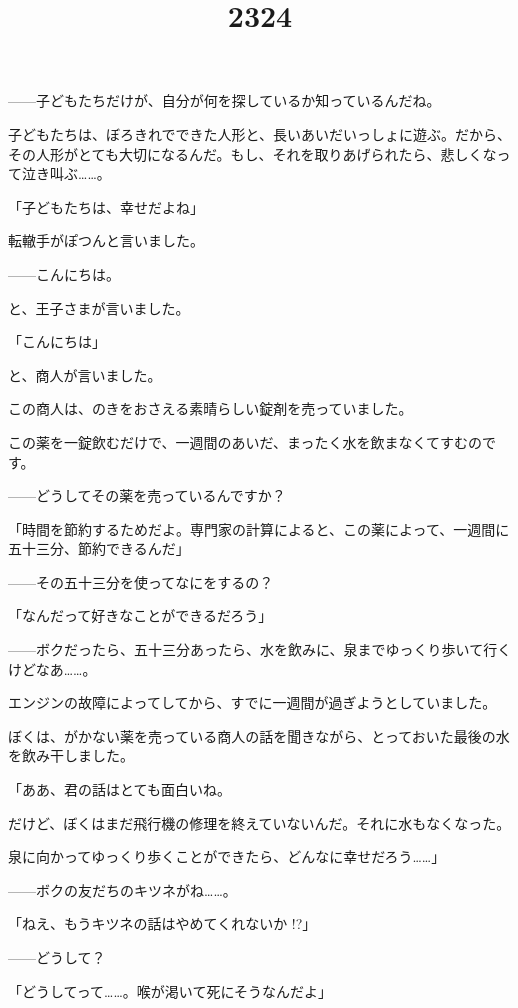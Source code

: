 ——子どもたちだけが、自分が何を探しているか知っているんだね。

子どもたちは、ぼろきれでできた人形と、長いあいだいっしょに遊ぶ。だから、その人形がとても大切になるんだ。もし、それを取りあげられたら、悲しくなって泣き叫ぶ……。

「子どもたちは、幸せだよね」

転轍手がぽつんと言いました。

\title{23}


——こんにちは。

と、王子さまが言いました。

「こんにちは」

と、商人が言いました。

この商人は、のきをおさえる素晴らしい錠剤を売っていました。

この薬を一錠飲むだけで、一週間のあいだ、まったく水を飲まなくてすむのです。

——どうしてその薬を売っているんですか？

「時間を節約するためだよ。専門家の計算によると、この薬によって、一週間に五十三分、節約できるんだ」


——その五十三分を使ってなにをするの？

「なんだって好きなことができるだろう」

——ボクだったら、五十三分あったら、水を飲みに、泉までゆっくり歩いて行くけどなあ……。

\title{24}


エンジンの故障によってしてから、すでに一週間が過ぎようとしていました。

ぼくは、がかない薬を売っている商人の話を聞きながら、とっておいた最後の水を飲み干しました。

「ああ、君の話はとても面白いね。

だけど、ぼくはまだ飛行機の修理を終えていないんだ。それに水もなくなった。

泉に向かってゆっくり歩くことができたら、どんなに幸せだろう……」

——ボクの友だちのキツネがね……。

「ねえ、もうキツネの話はやめてくれないか !?」

——どうして？

「どうしてって……。喉が渇いて死にそうなんだよ」

